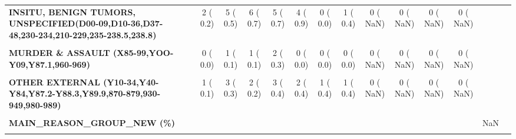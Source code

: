 \documentclass[
]{article}
\begin{document}
\begin{table}[H]
\begin{tabular}[t]{>{\raggedright\arraybackslash}p{5em}ccccccccccccc}
\textbf{INSITU, BENIGN TUMORS, UNSPECIFIED(D00-09,D10-36,D37-48,230-234,210-229,235-238.5,238.8)} & 2 (  0.2) & 5 (  0.5) & 6 (  0.7) & 5 (  0.7) & 4 (  0.9) & 0 (  0.0) & 1 (  0.4) & 0 (  NaN) & 0 (  NaN) & 0 (  NaN) & 0 (  NaN) &  \vphantom{1} & \\
\textbf{\cellcolor{gray!10}{KIDNEY(N00-12, N17-19, N25-29,580-589)}} & \cellcolor{gray!10}{47 (  5.1)} & \cellcolor{gray!10}{45 (  4.6)} & \cellcolor{gray!10}{52 (  5.8)} & \cellcolor{gray!10}{38 (  5.2)} & \cellcolor{gray!10}{21 (  4.6)} & \cellcolor{gray!10}{25 (  9.2)} & \cellcolor{gray!10}{11 (  4.9)} & \cellcolor{gray!10}{0 (  NaN)} & \cellcolor{gray!10}{0 (  NaN)} & \cellcolor{gray!10}{0 (  NaN)} & \cellcolor{gray!10}{0 (  NaN)} & \cellcolor{gray!10}{ \vphantom{1}} & \cellcolor{gray!10}{}\\
\textbf{MURDER \& ASSAULT (X85-99,YOO-Y09,Y87.1,960-969)} & 0 (  0.0) & 1 (  0.1) & 1 (  0.1) & 2 (  0.3) & 0 (  0.0) & 0 (  0.0) & 0 (  0.0) & 0 (  NaN) & 0 (  NaN) & 0 (  NaN) & 0 (  NaN) &  \vphantom{1} & \\
\textbf{\cellcolor{gray!10}{OTHER}} & \cellcolor{gray!10}{132 ( 14.4)} & \cellcolor{gray!10}{133 ( 13.7)} & \cellcolor{gray!10}{144 ( 16.0)} & \cellcolor{gray!10}{124 ( 16.8)} & \cellcolor{gray!10}{75 ( 16.4)} & \cellcolor{gray!10}{42 ( 15.4)} & \cellcolor{gray!10}{36 ( 16.0)} & \cellcolor{gray!10}{0 (  NaN)} & \cellcolor{gray!10}{0 (  NaN)} & \cellcolor{gray!10}{0 (  NaN)} & \cellcolor{gray!10}{0 (  NaN)} & \cellcolor{gray!10}{} & \cellcolor{gray!10}{}\\
\textbf{OTHER EXTERNAL (Y10-34,Y40-Y84,Y87.2-Y88.3,Y89.9,870-879,930-949,980-989)} & 1 (  0.1) & 3 (  0.3) & 2 (  0.2) & 3 (  0.4) & 2 (  0.4) & 1 (  0.4) & 1 (  0.4) & 0 (  NaN) & 0 (  NaN) & 0 (  NaN) & 0 (  NaN) &  \vphantom{1} & \\
\textbf{\cellcolor{gray!10}{SUICIDE (X60-84,Y87.0,950-959)}} & \cellcolor{gray!10}{1 (  0.1)} & \cellcolor{gray!10}{1 (  0.1)} & \cellcolor{gray!10}{3 (  0.3)} & \cellcolor{gray!10}{2 (  0.3)} & \cellcolor{gray!10}{1 (  0.2)} & \cellcolor{gray!10}{0 (  0.0)} & \cellcolor{gray!10}{0 (  0.0)} & \cellcolor{gray!10}{0 (  NaN)} & \cellcolor{gray!10}{0 (  NaN)} & \cellcolor{gray!10}{0 (  NaN)} & \cellcolor{gray!10}{0 (  NaN)} & \cellcolor{gray!10}{ \vphantom{1}} & \cellcolor{gray!10}{}\\
\textbf{MAIN\_REASON\_GROUP\_NEW (\%)} &  &  &  &  &  &  &  &  &  &  &  & NaN & \\
\textbf{\cellcolor{gray!10}{ACCIDENTS (V01-99,W00-99,X00-59,Y85-Y86,800-869,880-899,900-929)}} & \cellcolor{gray!10}{12 (  1.3)} & \cellcolor{gray!10}{12 (  1.2)} & \cellcolor{gray!10}{13 (  1.4)} & \cellcolor{gray!10}{12 (  1.6)} & \cellcolor{gray!10}{9 (  2.0)} & \cellcolor{gray!10}{1 (  0.4)} & \cellcolor{gray!10}{3 (  1.3)} & \cellcolor{gray!10}{0 (  NaN)} & \cellcolor{gray!10}{0 (  NaN)} & \cellcolor{gray!10}{0 (  NaN)} & \cellcolor{gray!10}{0 (  NaN)} & \cellcolor{gray!10}{} & \cellcolor{gray!10}{}\\

\end{tabular}
\end{table}
\end{document}
